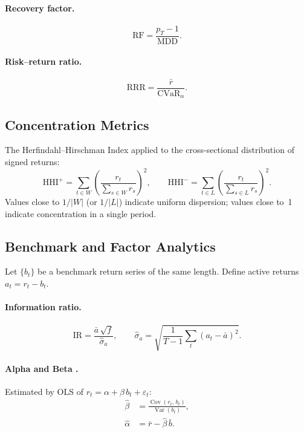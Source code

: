 \documentclass[11pt,a4paper]{article}
\newcommand{\Var}{\operatorname{Var}}
\newcommand{\Cov}{\operatorname{Cov}}
\begin{document}
\paragraph{Recovery factor.}
\begin{equation}
  \mathrm{RF} = \frac{p_T - 1}{\mathrm{MDD}}.
\end{equation}

\paragraph{Risk–return ratio.}
\begin{equation}
  \mathrm{RRR} = \frac{\bar{r}}{\mathrm{CVaR}_\alpha}.
\end{equation}

\subsection{Concentration Metrics}

The Herfindahl--Hirschman Index \citep{herfindahl1950} applied to the
cross-sectional distribution of signed returns:
\begin{equation}
  \mathrm{HHI}^+ = \sum_{t \in W}\left(\frac{r_t}{\sum_{s \in W} r_s}\right)^2,
  \qquad
  \mathrm{HHI}^- = \sum_{t \in L}\left(\frac{r_t}{\sum_{s \in L} r_s}\right)^2.
\end{equation}
Values close to $1/|W|$ (or $1/|L|$) indicate uniform dispersion; values
close to~1 indicate concentration in a single period.

\subsection{Benchmark and Factor Analytics}

Let $\{b_t\}$ be a benchmark return series of the same length.  Define active
returns $a_t = r_t - b_t$.

\paragraph{Information ratio.}
\begin{equation}
  \mathrm{IR} = \frac{\bar{a}\,\sqrt{f}}{\hat\sigma_a},
  \qquad \hat\sigma_a = \sqrt{\frac{1}{T-1}\sum_t(a_t - \bar{a})^2}.
\end{equation}

\paragraph{Alpha and Beta \citep{jensen1968}.}
Estimated by OLS of $r_t = \alpha + \beta\,b_t + \varepsilon_t$:
\begin{align}
  \hat\beta &= \frac{\Cov(r_t,\,b_t)}{\Var(b_t)}, \\
  \hat\alpha &= \bar{r} - \hat\beta\,\bar{b}.
\end{align}
\end{document}
